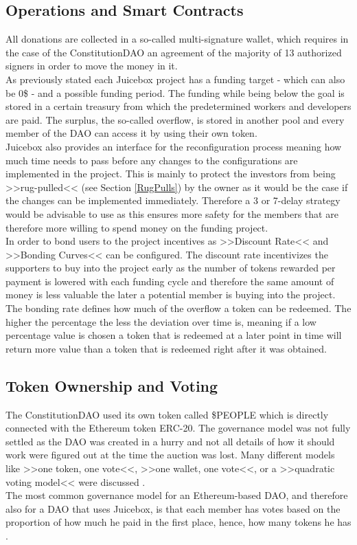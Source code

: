 \documentclass[a4paper,12pt]{report}
\begin{document}
	    \subsection[Operations and Smart Contracts]{Operations and Smart Contracts \cite{JuiceBoxHowTo}} \label{JBOperations}
	    \startsubsection
	        All donations are collected in a so-called multi-signature wallet, which requires in the case of the ConstitutionDAO an agreement of the majority of 13 authorized signers in order to move the money in it. \\
	        As previously stated each Juicebox project has a funding target - which can also be 0\$ - and a possible funding period. The funding while being below the goal is stored in a certain treasury from which the predetermined workers and developers are paid. The surplus, the so-called overflow, is stored in another pool and every member of the DAO can access it by using their own token. \\
	        Juicebox also provides an interface for the reconfiguration process meaning how much time needs to pass before any changes to the configurations are implemented in the project. This is mainly to protect the investors from being >>rug-pulled<< (see Section \ref{RugPulls}) by the owner as it would be the case if the changes can be implemented immediately. Therefore a 3 or 7-delay strategy would be advisable to use as this ensures more safety for the members that are therefore more willing to spend money on the funding project. \\
	        In order to bond users to the project incentives as >>Discount Rate<< and >>Bonding Curves<< can be configured. The discount rate incentivizes the supporters to buy into the project early as the number of tokens rewarded per payment is lowered with each funding cycle and therefore the same amount of money is less valuable the later a potential member is buying into the project. The bonding rate defines how much of the overflow a token can be redeemed. The higher the percentage the less the deviation over time is, meaning if a low percentage value is chosen a token that is redeemed at a later point in time will return more value than a token that is redeemed right after it was obtained.
	    \closesection
	    \subsection{Token Ownership and Voting}
	    \startsubsection
	        The ConstitutionDAO used its own token called \$PEOPLE which is directly connected with the Ethereum token ERC-20. The governance model was not fully settled as the DAO was created in a hurry and not all details of how it should work were figured out at the time the auction was lost. Many different models like >>one token, one vote<<, >>one wallet, one vote<<, or a >>quadratic voting model<< were discussed \parencite{ConstDAOtheVerge}. \\
	        The most common governance model for an Ethereum-based DAO, and therefore also for a DAO that uses Juicebox, is that each member has votes based on the proportion of how much he paid in the first place, hence, how many tokens he has \parencite{EthDocs}.
	    \closesection
	\closesection
	
\end{document}
